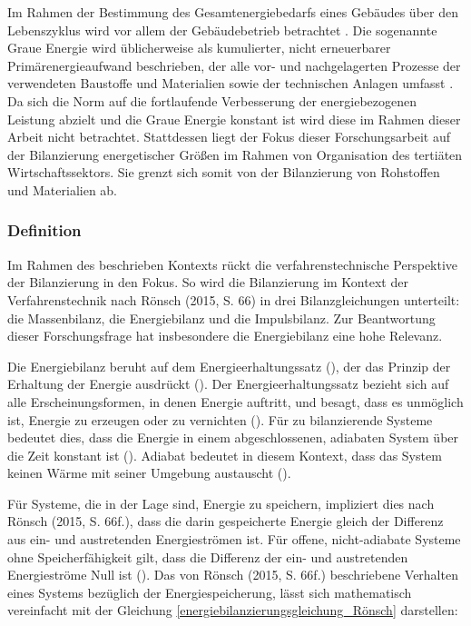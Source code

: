 Im Rahmen der Bestimmung des Gesamtenergiebedarfs eines Gebäudes über den Lebenszyklus wird vor allem der Gebäudebetrieb betrachtet \cite[S. 133]{Musall.2015}.
Die sogenannte Graue Energie wird üblicherweise als kumulierter, nicht erneuerbarer Primärenergieaufwand beschrieben, der alle vor- und nachgelagerten 
Prozesse der verwendeten Baustoffe und Materialien sowie der technischen Anlagen umfasst \cite[S. 133]{Musall.2015}. Da sich die Norm auf die 
fortlaufende Verbesserung der energiebezogenen Leistung abzielt und die Graue Energie konstant ist wird diese im Rahmen dieser Arbeit nicht 
betrachtet. 
Stattdessen liegt der Fokus dieser Forschungsarbeit auf der Bilanzierung energetischer Größen im Rahmen von Organisation des tertiäten Wirtschaftssektors. 
Sie grenzt sich somit von der Bilanzierung von Rohstoffen und Materialien ab.

\subsubsection{Definition}
Im Rahmen des beschrieben Kontexts rückt die verfahrenstechnische Perspektive der Bilanzierung in den Fokus. 
So wird die Bilanzierung im Kontext der Verfahrenstechnik nach Rönsch (2015, S. 66) in drei Bilanzgleichungen unterteilt: 
die Massenbilanz, die Energiebilanz und die Impulsbilanz. 
Zur Beantwortung dieser Forschungsfrage hat insbesondere die Energiebilanz eine hohe Relevanz.

Die Energiebilanz beruht auf dem Energieerhaltungssatz (\cite[S. 66]{Rönsch.2015}), der das Prinzip der Erhaltung 
der Energie ausdrückt (\cite[S. 57]{Baehr.1966}). Der Energieerhaltungssatz bezieht sich auf alle Erscheinungsformen, in denen Energie auftritt, 
und besagt, dass es unmöglich ist, Energie zu erzeugen oder zu vernichten (\cite[S. 57]{Baehr.1966}). 
Für zu bilanzierende Systeme bedeutet dies, dass die Energie in einem abgeschlossenen, adiabaten System über die Zeit 
konstant ist (\cite[S. 66]{Rönsch.2015}). 
Adiabat bedeutet in diesem Kontext, dass das System keinen Wärme mit seiner Umgebung austauscht (\cite[S. 66]{Rönsch.2015}). 

Für Systeme, die in der Lage sind, Energie zu speichern, impliziert dies nach Rönsch (2015, S. 66f.), 
dass die darin gespeicherte Energie gleich der Differenz aus ein- und austretenden Energieströmen ist. 
Für offene, nicht-adiabate Systeme ohne Speicherfähigkeit gilt, dass die Differenz der ein- und austretenden Energieströme Null ist 
(\cite[S. 66f.]{Rönsch.2015}).
Das von Rönsch (2015, S. 66f.) beschriebene Verhalten eines Systems bezüglich der Energiespeicherung, lässt sich mathematisch 
vereinfacht mit der Gleichung \eqref{energiebilanzierungsgleichung_Rönsch} darstellen:

